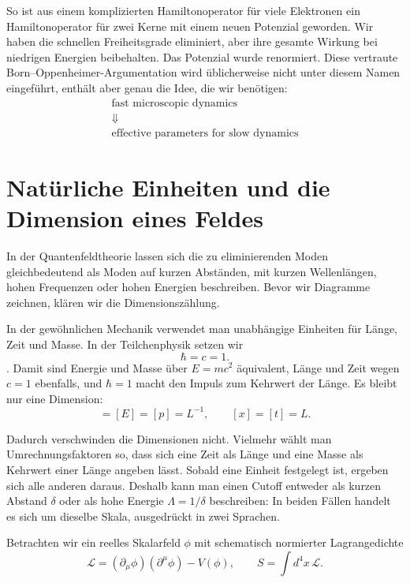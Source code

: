 So ist aus einem komplizierten Hamiltonoperator für viele Elektronen ein Hamiltonoperator für zwei Kerne mit einem neuen Potenzial geworden. Wir haben die schnellen Freiheitsgrade eliminiert, aber ihre gesamte Wirkung bei niedrigen Energien beibehalten. Das Potenzial wurde renormiert. Diese vertraute Born--Oppenheimer-Argumentation wird üblicherweise nicht unter diesem Namen eingeführt, enthält aber genau die Idee, die wir benötigen: \begin{equation}
\begin{gathered}
\text{fast microscopic dynamics}\\
\Downarrow\\
\text{effective parameters for slow dynamics}
\end{gathered}
\end{equation}

\section{Natürliche Einheiten und die Dimension eines Feldes}

In der Quantenfeldtheorie lassen sich die zu eliminierenden Moden gleichbedeutend als Moden auf kurzen Abständen, mit kurzen Wellenlängen, hohen Frequenzen oder hohen Energien beschreiben. Bevor wir Diagramme zeichnen, klären wir die Dimensionszählung.

In der gewöhnlichen Mechanik verwendet man unabhängige Einheiten für Länge, Zeit und Masse. In der Teilchenphysik setzen wir \begin{equation}
\hbar=c=1.
\end{equation}. Damit sind Energie und Masse über \(E=mc^2\) äquivalent, Länge und Zeit wegen \(c=1\) ebenfalls, und \(\hbar=1\) macht den Impuls zum Kehrwert der Länge. Es bleibt nur eine Dimension: \begin{equation}
[M]=[E]=[p]=L^{-1},
\qquad
[x]=[t]=L.
\label{eq:natural-units}
\end{equation}

Dadurch verschwinden die Dimensionen nicht. Vielmehr wählt man Umrechnungsfaktoren so, dass sich eine Zeit als Länge und eine Masse als Kehrwert einer Länge angeben lässt. Sobald eine Einheit festgelegt ist, ergeben sich alle anderen daraus. Deshalb kann man einen Cutoff entweder als kurzen Abstand \(\delta\) oder als hohe Energie \(\Lambda=1/\delta\) beschreiben: In beiden Fällen handelt es sich um dieselbe Skala, ausgedrückt in zwei Sprachen.

Betrachten wir ein reelles Skalarfeld \(\phi\) mit schematisch normierter Lagrangedichte \begin{equation}
\mathcal L=(\partial_\mu\phi)(\partial^\mu\phi)-V(\phi),
\qquad
S=\int d^4x\,\mathcal L.
\label{eq:scalar-action}
\end{equation}

